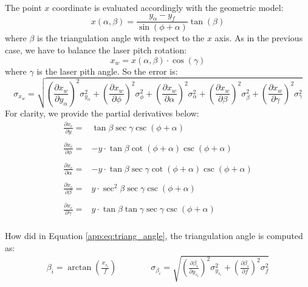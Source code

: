 The point $x$ coordinate is evaluated accordingly with the geometric model:
  \begin{equation*}
    x(\alpha, \beta) = \frac{y_\alpha - y_f}{\sin(\phi + \alpha)}\tan(\beta)
  \end{equation*}
where $\beta$ is the triangulation angle with respect to the $x$ axis. As in the previous case, we have to balance the laser pitch rotation:
  \begin{equation*}
    x_w = x(\alpha, \beta) \cdot \cos(\gamma)
  \end{equation*}
where $\gamma$ is the laser pith angle. So the error is:
  \begin{equation}
    \sigma_{x_w} = \sqrt{
      \left( \frac{\partial x_w}{\partial y_\alpha} \right)^2 \sigma_{y_\alpha}^2 +
      \left( \frac{\partial x_w}{\partial \phi} \right)^2 \sigma_\phi^2 +
      \left( \frac{\partial x_w}{\partial \alpha} \right)^2 \sigma_\alpha^2 +
      \left( \frac{\partial x_w}{\partial \beta} \right)^2 \sigma_\beta^2 +
      \left( \frac{\partial x_w}{\partial \gamma} \right)^2 \sigma_\gamma^2
    }
    \label{app:eq:sigma-xw}
  \end{equation}
For clarity, we provide the partial derivatives below:
  \begin{equation*}
    \begin{array}{rl}
      \frac{\partial x_c}{\partial y} = & \tan\beta\sec\gamma\csc(\phi + \alpha) \\~\\
      \frac{\partial x_c}{\partial \phi} = & -y\cdot\tan\beta\cot(\phi + \alpha)\csc(\phi + \alpha) \\~\\
      \frac{\partial x_c}{\partial \alpha} = & -y\cdot\tan\beta\sec\gamma\cot(\phi + \alpha)\csc(\phi + \alpha) \\~\\
      \frac{\partial x_c}{\partial \beta} = & y\cdot\sec^2\beta\sec\gamma\csc(\phi + \alpha) \\~\\
      \frac{\partial x_c}{\partial \gamma} = & y\cdot \tan\beta\tan\gamma\sec\gamma\csc(\phi + \alpha)
    \end{array}
  \end{equation*} \\

How did in Equation \ref{app:eq:triang_angle}, the triangulation angle is computed as:
  \begin{equation*}
    \begin{matrix}
      \beta_i = \arctan\left( \frac{x_{s_i}}{f} \right)
      \qquad \qquad
  	  \sigma_{\beta_i} = \sqrt{
  	      \left( \frac{\partial \beta_i}{\partial y_{s_i}} \right)^2 \sigma_{y_{s_i}}^2
  	      + \left( \frac{\partial \beta_i}{\partial f} \right)^2 \sigma_f^2
  	  }
    \end{matrix}
  \end{equation*} \\

